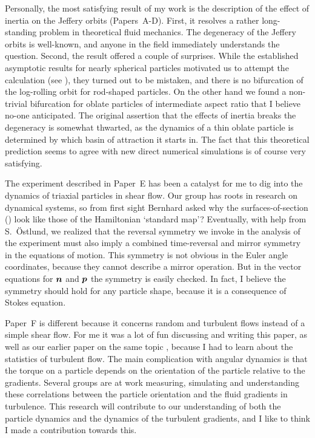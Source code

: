 \documentclass[thesis.tex]{subfiles}
\begin{document}
Personally, the most satisfying result of my work is the description of the effect of inertia on the Jeffery orbits (Papers~A-D). First, it resolves a rather long-standing problem in theoretical fluid mechanics. The degeneracy of the Jeffery orbits is well-known, and anyone in the field immediately understands the question. Second, the result offered a couple of surprises. While the established asymptotic results for nearly spherical particles motivated us to attempt the calculation (see ), they turned out to be mistaken, and there is no bifurcation of the log-rolling orbit for rod-shaped particles. On the other hand we found a non-trivial bifurcation for oblate particles of intermediate aspect ratio that I believe no-one anticipated. The original assertion that the effects of inertia breaks the degeneracy is somewhat thwarted, as the dynamics of a thin oblate particle is determined by which basin of attraction it starts in. The fact that this theoretical prediction seems to agree with new direct numerical simulations is of course very satisfying.

The experiment described in Paper~E has been a catalyst for me to dig into the dynamics of triaxial particles in shear flow. Our group has roots in research on dynamical systems, so from first sight Bernhard asked why the surfaces-of-section () look like those of the Hamiltonian {\lq}standard map{\rq}? Eventually, with help from S.~Östlund, we realized that the reversal symmetry we invoke in the analysis of the experiment must also imply a combined time-reversal and mirror symmetry in the equations of motion. This symmetry is not obvious in the Euler angle coordinates, because they cannot describe a mirror operation. But in the vector equations for $\mbox{\boldmath$n$}$ and $\mbox{\boldmath$p$}$ the symmetry is easily checked. In fact, I believe the symmetry should hold for any particle shape, because it is a consequence of Stokes equation.

Paper~F is different because it concerns random and turbulent flows instead of a simple shear flow. For me it was a lot of fun discussing and writing this paper, as well as our earlier paper on the same topic \cite{gustavsson2014}, because I had to learn about the statistics of turbulent flow. The main complication with angular dynamics is that the torque on a particle depends on the orientation of the particle relative to the gradients. Several groups are at work measuring, simulating and understanding these correlations between the particle orientation and the fluid gradients in turbulence. This research will contribute to our understanding of both the particle dynamics and the dynamics of the turbulent gradients, and I like to think I made a contribution towards this.
\end{document}
